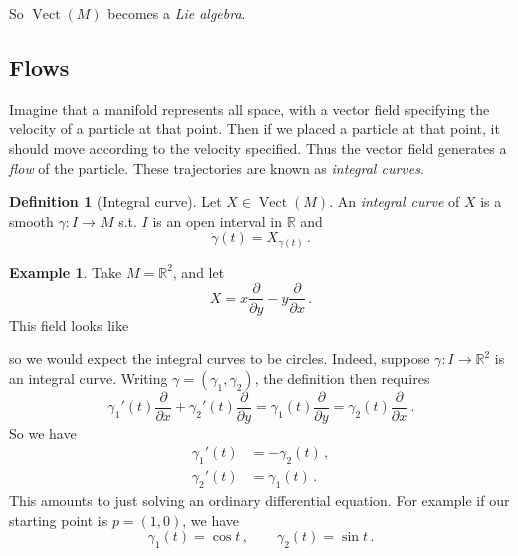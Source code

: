 \documentclass[a4paper,11pt]{article}
\theoremstyle{definition}
\newtheorem*{defn}{Definition}
\newtheorem*{ex}{Example}
\DeclareMathOperator{\Vect}{Vect}
\numberwithin{equation}{section}
\begin{document}
So $\Vect(M)$ becomes a \emph{Lie algebra}.

\subsection{Flows}
Imagine that a manifold represents all space, with a vector field specifying the velocity of a particle at that point. Then if we placed a particle at that point, it should move according to the velocity specified. Thus the vector field generates a \emph{flow} of the particle. These trajectories are known as \emph{integral curves}.

\begin{defn}[Integral curve]
Let $X\in\Vect(M)$. An \emph{integral curve} of $X$ is a smooth $\gamma:I\rightarrow M$ s.t. $I$ is an open interval in $\mathbb{R}$ and
\[
\dot{\gamma}(t)=X_{\gamma(t)}\,.
\]
\end{defn}

\begin{ex}
Take $M=\mathbb{R}^2$, and let
\[
X=x\frac{\partial}{\partial y}-y\frac{\partial}{\partial x}\,.
\]
This field looks like
\begin{figure}[h]
    \centering
\end{figure}

so we would expect the integral curves to be circles. Indeed, suppose $\gamma:I\rightarrow\mathbb{R}^2$ is an integral curve. Writing $\gamma=(\gamma_1,\gamma_2)$, the definition then requires
\[
\gamma_1'(t)\frac{\partial}{\partial x}+\gamma_2'(t)\frac{\partial}{\partial y}=\gamma_1(t)\frac{\partial}{\partial y}=\gamma_2(t)\frac{\partial}{\partial x}\,.
\]
So we have
\begin{align*}
    \gamma_1'(t)&=-\gamma_2(t)\,,\\
    \gamma_2'(t)&=\gamma_1(t)\,.
\end{align*}
This amounts to just solving an ordinary differential equation. For example if our starting point is $p=(1,0)$, we have
\[
\gamma_1(t)=\cos t\,,\qquad\gamma_2(t)=\sin t\,.
\]
\end{ex}
\end{document}
